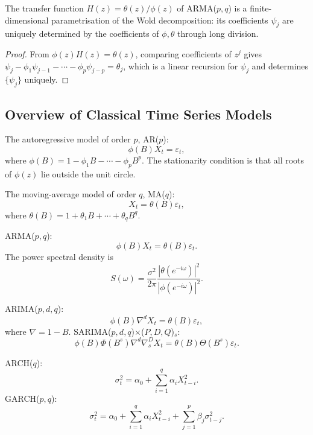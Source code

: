 \begin{corollary}\label{cor:ts_arma_wold}
The transfer function $H(z)=\theta(z)/\phi(z)$ of ARMA($p,q$) is a finite-dimensional parametrisation of the Wold decomposition: its coefficients $\psi_j$ are uniquely determined by the coefficients of $\phi,\theta$ through long division.
\end{corollary}

\begin{proof}
From $\phi(z)H(z)=\theta(z)$, comparing coefficients of $z^j$ gives $\psi_j-\phi_1\psi_{j-1}-\cdots-\phi_p\psi_{j-p}=\theta_j$, which is a linear recursion for $\psi_j$ and determines $\{\psi_j\}$ uniquely.
\end{proof}

\subsection{Overview of Classical Time Series Models}

\begin{definition}[AR Model]\label{def:ts_ar}
The autoregressive model of order $p$, AR($p$):
\[
\phi(B) X_t = \varepsilon_t,
\]
where $\phi(B) = 1 - \phi_1 B - \cdots - \phi_p B^p$. The stationarity condition is that all roots of $\phi(z)$ lie outside the unit circle.
\end{definition}

\begin{definition}[MA Model]\label{def:ts_ma}
The moving-average model of order $q$, MA($q$):
\[
X_t = \theta(B)\varepsilon_t,
\]
where $\theta(B) = 1 + \theta_1 B + \cdots + \theta_q B^q$.
\end{definition}

\begin{definition}\label{def:ts_arma}
ARMA($p,q$):
\[
\phi(B) X_t = \theta(B)\varepsilon_t.
\]
The power spectral density is
\[
S(\omega) = \frac{\sigma^2}{2\pi}\frac{|\theta(e^{-i\omega})|^2}{|\phi(e^{-i\omega})|^2}.
\]
\end{definition}

\begin{definition}\label{def:ts_arima_sarima}
ARIMA($p,d,q$):
\[
\phi(B)\nabla^d X_t = \theta(B)\varepsilon_t,
\]
where $\nabla = 1-B$. SARIMA($p,d,q$)$\times$($P,D,Q$)$_s$:
\[
\phi(B)\Phi(B^s)\nabla^d\nabla_s^D X_t = \theta(B)\Theta(B^s)\varepsilon_t.
\]
\end{definition}

\begin{definition}\label{def:ts_arch_garch}
ARCH($q$):
\[
\sigma_t^2 = \alpha_0 + \sum_{i=1}^q \alpha_i X_{t-i}^2.
\]
GARCH($p,q$):
\[
\sigma_t^2 = \alpha_0 + \sum_{i=1}^q \alpha_i X_{t-i}^2 + \sum_{j=1}^p \beta_j \sigma_{t-j}^2.
\]
\end{definition}

